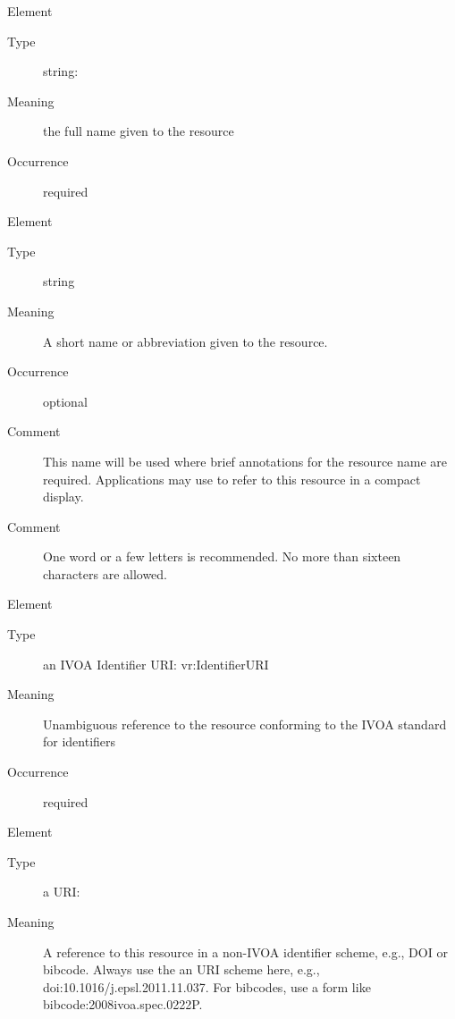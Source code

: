 \documentclass[11pt,a4paper]{ivoa}
\begin{document}
\begin{generated}
\begin{bigdescription}
\begin{description}
\end{description}
\item[Element \xmlel{title}]
\begin{description}
\item[Type] string: 
\item[Meaning] 
                  the full name given to the resource
               
\item[Occurrence] required

\end{description}
\item[Element \xmlel{shortName}]
\begin{description}
\item[Type] string
\item[Meaning] 
                 A short name or abbreviation given to the resource.
               
\item[Occurrence] optional

\item[Comment] 
                 This name will be used where brief annotations for
                 the resource name are required.  Applications may 
                 use to refer to this resource in a compact display.   
               
\item[Comment] 
                 One word or a few letters is recommended.  No more
                 than sixteen characters are allowed.
               

\end{description}
\item[Element \xmlel{identifier}]
\begin{description}
\item[Type] an IVOA Identifier URI: vr:IdentifierURI
\item[Meaning] 
                  Unambiguous reference to the resource conforming to the IVOA
                  standard for identifiers
               
\item[Occurrence] required


\end{description}
\item[Element \xmlel{altIdentifier}]
\begin{description}
\item[Type] a URI: 
\item[Meaning] 
                  A reference to this resource in a non-IVOA identifier
                  scheme, e.g., DOI or bibcode.  Always use the an URI scheme
                  here, e.g., doi:10.1016/j.epsl.2011.11.037.  For bibcodes,
                  use a form like bibcode:2008ivoa.spec.0222P.
               

\end{description}
\end{bigdescription}
\end{generated}
\end{document}
